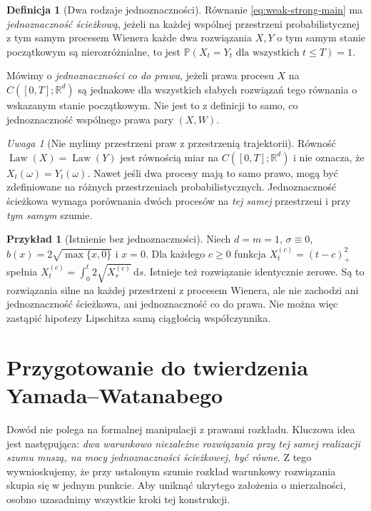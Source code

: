 \documentclass[11pt,a4paper,oneside]{report}
\numberwithin{equation}{chapter}
\theoremstyle{plain}
\theoremstyle{definition}
\newtheorem{definicja}{Definicja}[chapter]
\newtheorem{przyklad}{Przykład}[chapter]
\theoremstyle{remark}
\newtheorem{uwaga}{Uwaga}[chapter]
\newcommand{\R}{\mathbb{R}}
\newcommand{\Prob}{\mathbb{P}}
\newcommand{\Law}{\operatorname{Law}}
\newcommand{\dd}{\mathrm{d}}
\begin{document}
\begin{definicja}[Dwa rodzaje jednoznaczności]\label{def:volIII:14:03}
\label{def:path-law-uniq}
Równanie \eqref{eq:weak-strong-main} ma
\emph{jednoznaczność ścieżkową}, jeżeli na każdej wspólnej
przestrzeni probabilistycznej z tym samym procesem Wienera
każde dwa rozwiązania $X,Y$ o tym samym stanie początkowym
są nierozróżnialne, to jest
$\Prob(X_t=Y_t\text{ dla wszystkich }t\le T)=1$.

Mówimy o \emph{jednoznaczności co do prawa}, jeżeli prawa
procesu $X$ na $C([0,T];\R^d)$ są jednakowe dla wszystkich
słabych rozwiązań tego równania o wskazanym stanie początkowym.
Nie jest to z definicji to samo, co jednoznaczność wspólnego
prawa pary $(X,W)$.
\end{definicja}

\begin{uwaga}[Nie mylimy przestrzeni praw z przestrzenią trajektorii]
Równość $\Law(X)=\Law(Y)$ jest równością miar na
$C([0,T];\R^d)$ i nie oznacza, że $X_t(\omega)=Y_t(\omega)$.
Nawet jeśli dwa procesy mają to samo prawo, mogą być
zdefiniowane na różnych przestrzeniach probabilistycznych.
Jednoznaczność ścieżkowa wymaga porównania dwóch procesów
na \emph{tej samej} przestrzeni i przy \emph{tym samym} szumie.
\end{uwaga}

\begin{przyklad}[Istnienie bez jednoznaczności]
Niech $d=m=1$, $\sigma\equiv0$,
$b(x)=2\sqrt{\max\{x,0\}}$ i $x=0$.
Dla każdego $c\ge0$ funkcja
$X_t^{(c)}=(t-c)_+^2$ spełnia
$X_t^{(c)}=\int_0^t2\sqrt{X_s^{(c)}}\,\dd s$.
Istnieje też rozwiązanie identycznie zerowe.
Są to rozwiązania silne na każdej przestrzeni z procesem
Wienera, ale nie zachodzi ani jednoznaczność ścieżkowa,
ani jednoznaczność co do prawa. Nie można więc zastąpić
hipotezy Lipschitza samą ciągłością współczynnika.
\end{przyklad}

\section{Przygotowanie do twierdzenia Yamada--Watanabego}\label{sec:volIII:14:03}

Dowód nie polega na formalnej manipulacji z prawami
rozkładu. Kluczowa idea jest następująca: \emph{dwa
warunkowo niezależne rozwiązania przy tej samej realizacji
szumu muszą, na mocy jednoznaczności ścieżkowej, być równe}.
Z tego wywnioskujemy, że przy ustalonym szumie rozkład
warunkowy rozwiązania skupia się w jednym punkcie.
Aby uniknąć ukrytego założenia o mierzalności, osobno
uzasadnimy wszystkie kroki tej konstrukcji.
\end{document}
